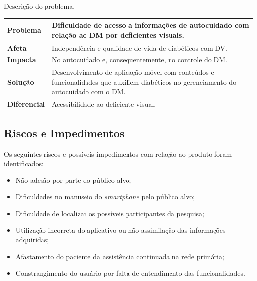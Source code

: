 \begin{quadro}[htb]
    \caption{Descrição do problema.}
    \label{qua-desc-pro}
    \begin{center}
        \begin{tabular}{|p{4.0cm}|p{10.0cm}|}
            \hline
            \textbf{Problema}    & Dificuldade de acesso a informações de autocuidado com relação ao DM por deficientes visuais.                                          \\
            \hline
            \textbf{Afeta}       & Independência e qualidade de vida de diabéticos com DV\@.                                                                              \\
            \hline
            \textbf{Impacta}     & No autocuidado e, consequentemente, no controle do DM\@.                                                                               \\
            \hline
            \textbf{Solução}     & Desenvolvimento de aplicação móvel com conteúdos e funcionalidades que auxiliem diabéticos no gerenciamento do autocuidado com o DM\@. \\
            \hline
            \textbf{Diferencial} & Acessibilidade ao deficiente visual.                                                                                                   \\
            \hline
        \end{tabular}
    \end{center}
\end{quadro}

\subsection{Riscos e Impedimentos}

Os seguintes riscos e possíveis impedimentos com relação ao produto foram identificados:

\begin{itemize}
    \item Não adesão por parte do público alvo;
    \item Dificuldades no manuseio do \emph{smartphone} pelo público alvo;
    \item Dificuldade de localizar os possíveis participantes da pesquisa;
    \item Utilização incorreta do aplicativo ou não assimilação das informações adquiridas;
    \item Afastamento do paciente da assistência continuada na rede primária;
    \item Constrangimento do usuário por falta de entendimento das funcionalidades.
\end{itemize}


